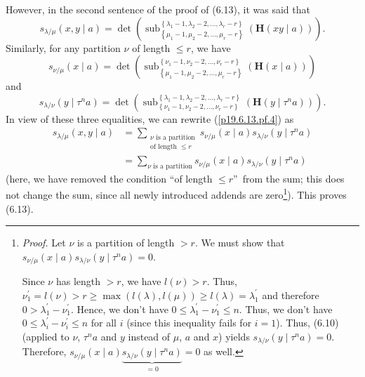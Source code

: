 \documentclass[numbers=enddot,12pt,final,onecolumn,notitlepage]{scrartcl}%
\theoremstyle{definition}
\let\sumnonlimits\sum
\renewcommand{\sum}{\sumnonlimits\limits}
\begin{document}
\begin{enumerate}
However, in the second sentence of the proof of (6.13), it was said that%
\[
s_{\lambda/\mu}\left(  x,y\mid a\right)  =\det\left(  \operatorname*{sub}%
\nolimits_{\left\{  \mu_{1}-1,\mu_{2}-2,\ldots,\mu_{r}-r\right\}  }^{\left\{
\lambda_{1}-1,\lambda_{2}-2,\ldots,\lambda_{r}-r\right\}  }\left(
\mathbf{H}\left(  xy\mid a\right)  \right)  \right)  .
\]
Similarly, for any partition $\nu$ of length $\leq r$, we have%
\[
s_{\nu/\mu}\left(  x\mid a\right)  =\det\left(  \operatorname*{sub}%
\nolimits_{\left\{  \mu_{1}-1,\mu_{2}-2,\ldots,\mu_{r}-r\right\}  }^{\left\{
\nu_{1}-1,\nu_{2}-2,\ldots,\nu_{r}-r\right\}  }\left(  \mathbf{H}\left(  x\mid
a\right)  \right)  \right)
\]
and%
\[
s_{\lambda/\nu}\left(  y\mid\tau^{n}a\right)  =\det\left(  \operatorname*{sub}%
\nolimits_{\left\{  \nu_{1}-1,\nu_{2}-2,\ldots,\nu_{r}-r\right\}  }^{\left\{
\lambda_{1}-1,\lambda_{2}-2,\ldots,\lambda_{r}-r\right\}  }\left(
\mathbf{H}\left(  y\mid\tau^{n}a\right)  \right)  \right)  .
\]
In view of these three equalities, we can rewrite (\ref{p19.6.13.pf.4}) as%
\begin{align*}
s_{\lambda/\mu}\left(  x,y\mid a\right)   &  =\sum_{\substack{\nu\text{ is a
partition}\\\text{of length }\leq r}}s_{\nu/\mu}\left(  x\mid a\right)
s_{\lambda/\nu}\left(  y\mid\tau^{n}a\right) \\
&  =\sum_{\nu\text{ is a partition}}s_{\nu/\mu}\left(  x\mid a\right)
s_{\lambda/\nu}\left(  y\mid\tau^{n}a\right)
\end{align*}
(here, we have removed the condition \textquotedblleft of length $\leq
r$\textquotedblright\ from the sum; this does not change the sum, since all
newly introduced addends are zero\footnote{\textit{Proof.} Let $\nu$ is a
partition of length $>r$. We must show that $s_{\nu/\mu}\left(  x\mid
a\right)  s_{\lambda/\nu}\left(  y\mid\tau^{n}a\right)  =0$.
\par
Since $\nu$ has length $>r$, we have $l\left(  \nu\right)  >r$. Thus, $\nu
_{1}^{\prime}=l\left(  \nu\right)  >r\geq\max\left(  l\left(  \lambda\right)
,l\left(  \mu\right)  \right)  \geq l\left(  \lambda\right)  =\lambda
_{1}^{\prime}$ and therefore $0>\lambda_{1}^{\prime}-\nu_{1}^{\prime}$. Hence,
we don't have $0\leq\lambda_{1}^{\prime}-\nu_{1}^{\prime}\leq n$. Thus, we
don't have $0\leq\lambda_{i}^{\prime}-\nu_{i}^{\prime}\leq n$ for all $i$
(since this inequality fails for $i=1$). Thus, (6.10) (applied to $\nu$,
$\tau^{n}a$ and $y$ instead of $\mu$, $a$ and $x$) yields $s_{\lambda/\nu
}\left(  y\mid\tau^{n}a\right)  =0$. Therefore, $s_{\nu/\mu}\left(  x\mid
a\right)  \underbrace{s_{\lambda/\nu}\left(  y\mid\tau^{n}a\right)  }_{=0}=0$
as well.}). This proves (6.13).


\end{enumerate}
\end{document}
